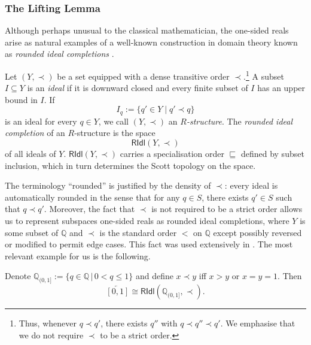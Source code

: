 \documentclass[a4paper, 11pt,reqno]{amsart}
\newcommand{\MING}[1]{{\color{blue} {\tiny \bf (M:)} {\bf #1}}}
\newcommand{\qint}{\mathbb{Q}_{(0,1]}}
\newcommand{\RIdl}{\mathsf{RIdl}}
\begin{document}
\subsubsection{The Lifting Lemma} Although perhaps unusual to the classical mathematician, the one-sided reals arise as natural examples of a well-known construction in domain theory known as \textit{rounded ideal completions} \cite{Smyth,Vi8}.


\begin{definition}\label{def:Rstructure}
	Let $(Y,\prec)$ be a set equipped with a dense transitive order $\prec$.\footnote{Thus, whenever $q\prec q'$, there exists $q''$ with $q\prec q''\prec q'$. We emphasise that we do not require $\prec$ to be a strict order.}
	A subset $I\subseteq Y$ is an \emph{ideal} if it is downward closed and every finite subset of $I$ has an upper bound in $I$. If
	\[
	I_q:=\{q'\in Y\mid q'\prec q\}
	\]
	is an ideal for every $q\in Y$, we call $(Y,\prec)$ an \emph{$R$-structure}. The \emph{rounded ideal completion} of an $R$-structure is the space
	\[
	\RIdl(Y,\prec)
	\]
	of all ideals of $Y$.  $\RIdl(Y,\prec)$ carries a specialisation order $\sqsubseteq$ defined by subset inclusion, which in turn determines the Scott topology on the space.
	
	
\end{definition}


The terminology ``rounded'' is justified by the density of $\prec$: every ideal is automatically rounded in the sense that  for any $q\in S$, there exists $q'\in S$ such that $q\prec q'$. Moreover, the fact that $\prec$ is not required to be a strict order allows us to represent subspaces one-sided reals as rounded ideal completions, where $Y$ is some subset of $\mathbb{Q}$ and $\prec$ is the standard order $<$ on $\mathbb{Q}$ except possibly reversed or modified to permit edge cases. This fact was used extensively in \cite{NV}. The most relevant example for us is the following.

\begin{example}\label{ex:ridlreals} Denote $\qint:=\{q\in\mathbb{Q} \,|\,0<q\leq 1 \}$ and define $x\prec y$ iff $x>y$ or $x=y=1$. Then 
	$$\overleftarrow{[0,1]}\cong \RIdl(\mathbb{Q}_{(0,1]},\prec).$$
	
\end{example}
\end{document}
